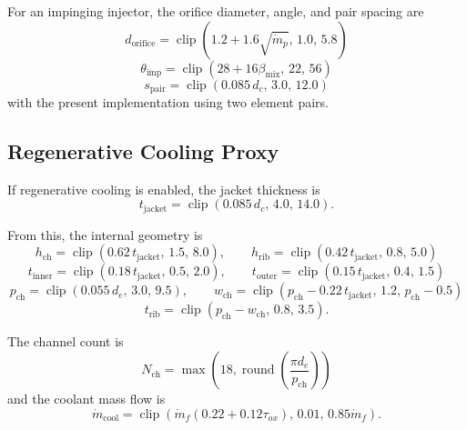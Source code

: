 \documentclass[11pt]{article}
\newcommand{\clip}{\operatorname{clip}}
\newcommand{\mdot}{\dot{m}}
\newcommand{\mdotp}{\dot{m}_{p}}
\newcommand{\mdotf}{\dot{m}_{f}}
\begin{document}
For an impinging injector, the orifice diameter, angle, and pair spacing are
\begin{equation}
d_{\text{orifice}}=\clip\!\left(1.2+1.6\sqrt{\mdotp},\,1.0,\,5.8\right)
\label{eq:impinging-orifice}
\end{equation}
\begin{equation}
\theta_{\text{imp}}=\clip(28+16\beta_{\text{mix}},\,22,\,56)
\label{eq:impinging-angle}
\end{equation}
\begin{equation}
s_{\text{pair}}=\clip(0.085\,d_c,\,3.0,\,12.0)
\label{eq:pair-spacing}
\end{equation}
with the present implementation using two element pairs.

\subsection{Regenerative Cooling Proxy}
If regenerative cooling is enabled, the jacket thickness is
\begin{equation}
t_{\text{jacket}}=\clip(0.085\,d_c,\,4.0,\,14.0).
\label{eq:jacket}
\end{equation}

From this, the internal geometry is
\begin{equation}
h_{\text{ch}}=\clip(0.62\,t_{\text{jacket}},\,1.5,\,8.0),
\qquad
h_{\text{rib}}=\clip(0.42\,t_{\text{jacket}},\,0.8,\,5.0)
\label{eq:regen-channel-depth}
\end{equation}
\begin{equation}
t_{\text{inner}}=\clip(0.18\,t_{\text{jacket}},\,0.5,\,2.0),
\qquad
t_{\text{outer}}=\clip(0.15\,t_{\text{jacket}},\,0.4,\,1.5)
\label{eq:regen-wall-thickness}
\end{equation}
\begin{equation}
p_{\text{ch}}=\clip(0.055\,d_e,\,3.0,\,9.5),
\qquad
w_{\text{ch}}=\clip\!\left(p_{\text{ch}}-0.22\,t_{\text{jacket}},\,1.2,\,p_{\text{ch}}-0.5\right)
\label{eq:regen-pitch-width}
\end{equation}
\begin{equation}
t_{\text{rib}}=\clip(p_{\text{ch}}-w_{\text{ch}},\,0.8,\,3.5).
\label{eq:regen-rib}
\end{equation}

The channel count is
\begin{equation}
N_{\text{ch}}=\max\!\left(18,\operatorname{round}\!\left(\frac{\pi d_e}{p_{\text{ch}}}\right)\right)
\label{eq:regen-count}
\end{equation}
and the coolant mass flow is
\begin{equation}
\mdot_{\text{cool}}
=
\clip\!\left(
\mdotf(0.22+0.12\tau_{ox}),
\,
0.01,\,
0.85\mdotf
\right).
\label{eq:regen-mdot}
\end{equation}
\end{document}
